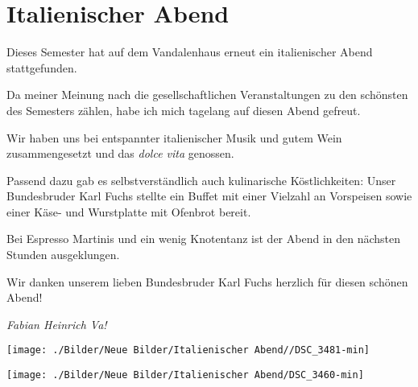 \section{Italienischer Abend}



\begin{multicols}{2}

Dieses Semester hat auf dem Vandalenhaus erneut ein italienischer Abend
stattgefunden.

Da meiner Meinung nach
die gesellschaftlichen Veranstaltungen zu den schönsten des Semesters zählen,
habe ich mich tagelang auf diesen Abend gefreut.

Wir haben uns bei entspannter italienischer Musik und gutem Wein
zusammengesetzt und das \textit{dolce vita} genossen.

Passend dazu gab es
selbstverständlich auch kulinarische Köstlichkeiten: Unser Bundesbruder Karl
Fuchs stellte ein Buffet mit einer Vielzahl an Vorspeisen sowie einer Käse- und
Wurstplatte mit Ofenbrot bereit.

Bei Espresso Martinis und ein wenig Knotentanz ist der Abend in den
nächsten Stunden ausgeklungen.

Wir danken unserem lieben Bundesbruder Karl Fuchs herzlich für diesen
schönen Abend!




	\begin{flushright}
		\hfill\emph{Fabian Heinrich Va!}
	\end{flushright}
\end{multicols}


\begin{figurehere}
		\begin{center}
			\texttt{[image: ./Bilder/Neue Bilder/Italienischer Abend//DSC\_3481-min]}
		\end{center}
	\end{figurehere}

\begin{center}
	\begin{figurehere}\texttt{[image: ./Bilder/Neue Bilder/Italienischer Abend/DSC\_3460-min]}
	\end{figurehere}
\end{center}
	
